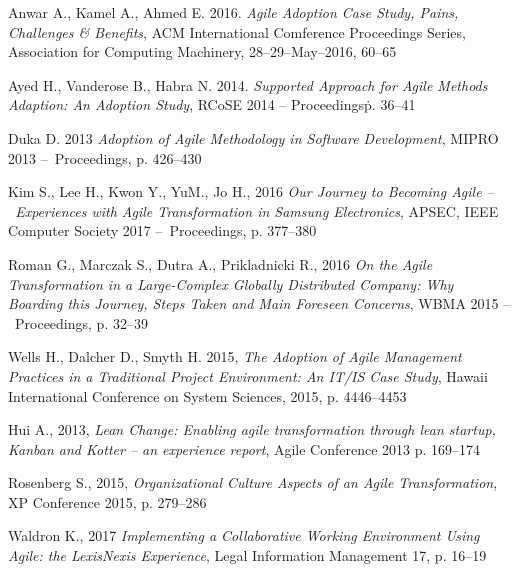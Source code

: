 \noindent [P1] Anwar A., Kamel A., Ahmed E. 2016. \textit{Agile Adoption Case Study, Pains, Challenges \& Benefits}, ACM International Comference Proceedings Series, Association for Computing Machinery, 28–29–May–2016, 60–65

\noindent [P2] Ayed H., Vanderose B., Habra N. 2014. \textit{Supported Approach
for Agile Methods Adaption: An Adoption Study}, RCoSE 2014 – Proceedings\. p. 36–41

\noindent [P3] Duka D. 2013 \textit{Adoption of Agile Methodology in Software Development}, MIPRO 2013 – Proceedings, p. 426–430

\noindent [P4] Kim S., Lee H., Kwon Y., YuM., Jo H., 2016 \textit{Our Journey to Becoming Agile – Experiences with Agile Transformation in Samsung Electronics}, APSEC, IEEE Computer Society 2017 – Proceedings, p. 377–380

\noindent [P5] Roman G., Marczak S., Dutra A., Prikladnicki R., 2016 \textit{On the Agile Transformation in a Large-Complex Globally Distributed Company: Why Boarding this Journey, Steps Taken and Main Foreseen Concerns}, WBMA 2015 – Proceedings, p. 32–39

\noindent [P6] Wells H., Dalcher D., Smyth H. 2015, \textit{The Adoption of Agile Management Practices in a Traditional Project Environment: An IT/IS Case Study}, Hawaii International Conference on System Sciences, 2015, p. 4446–4453

\noindent [P7] Hui A., 2013, \textit{Lean Change: Enabling agile transformation through lean startup, Kanban and Kotter – an experience report}, Agile Conference 2013 p. 169–174

\noindent [P8] Rosenberg S., 2015, \textit{Organizational Culture Aspects of an Agile Transformation}, XP Conference 2015, p. 279–286

\noindent [P9] Waldron K., 2017 \textit{Implementing a Collaborative Working Environment Using Agile: the LexisNexis Experience}, Legal Information Management 17, p. 16–19
